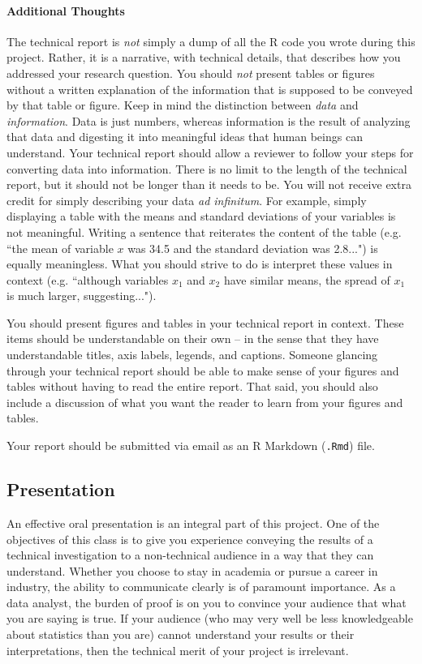\documentclass[10pt]{article}
\begin{document}
\paragraph{Additional Thoughts}

The technical report is \emph{not} simply a dump of all the R code you wrote during this project. Rather, it is a narrative, with technical details, that describes how you addressed your research question. You should \emph{not} present tables or figures without a written explanation of the information that is supposed to be conveyed by that table or figure. Keep in mind the distinction between \emph{data} and \emph{information}. Data is just numbers, whereas information is the result of analyzing that data and digesting it into meaningful ideas that human beings can understand. Your technical report should allow a reviewer to follow your steps for converting data into information. There is no limit to the length of the technical report, but it should not be longer than it needs to be. You will not receive extra credit for simply describing your data \emph{ad infinitum}. For example, simply displaying a table with the means and standard deviations of your variables is not meaningful. Writing a sentence that reiterates the content of the table (e.g. ``the mean of variable $x$ was 34.5 and the standard deviation was 2.8...") is equally meaningless. What you should strive to do is interpret these values in context (e.g. ``although variables $x_1$ and $x_2$ have similar means, the spread of $x_1$ is much larger, suggesting..."). 

You should present figures and tables in your technical report in context. These items should be understandable on their own -- in the sense that they have understandable titles, axis labels, legends, and captions. Someone glancing through your technical report should be able to make sense of your figures and tables without having to read the entire report. That said, you should also include a discussion of what you want the reader to learn from your figures and tables. 

Your report should be submitted via email as an R Markdown (\texttt{.Rmd}) file.

\subsection{Presentation}

An effective oral presentation is an integral part of this project. One of the objectives of this class is to give you experience conveying the results of a technical investigation to a non-technical audience in a way that they can understand. Whether you choose to stay in academia or pursue a career in industry, the ability to communicate clearly is of paramount importance. As a data analyst, the burden of proof is on you to convince your audience that what you are saying is true. If your audience (who may very well be less knowledgeable about statistics than you are) cannot understand your results or their interpretations, then the technical merit of your project is irrelevant. 
\end{document}
